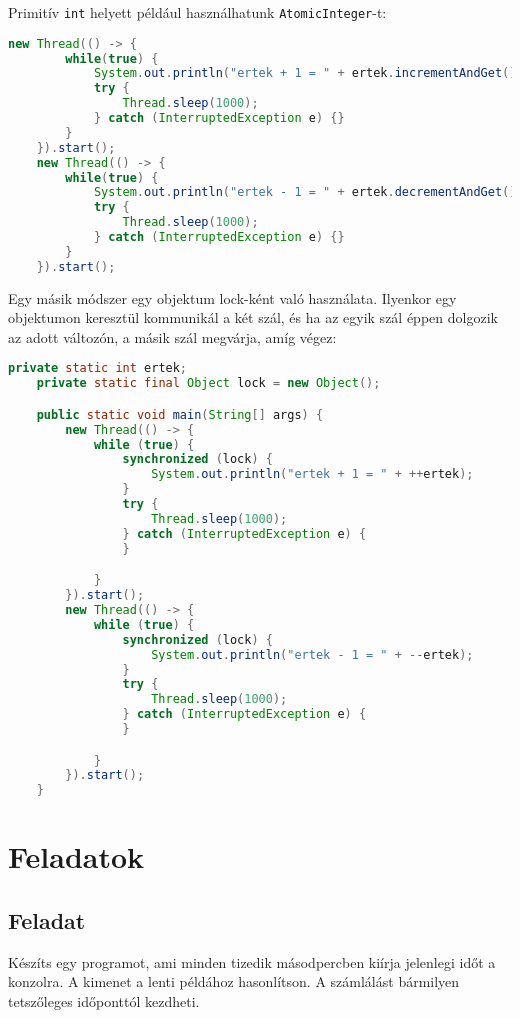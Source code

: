 \documentclass{article}
\let\l\lstinline
\begin{document}
Primitív \l{int} helyett például használhatunk \l{AtomicInteger}-t:

\begin{lstlisting}[language=Java, caption=AtomicInteger használata]
	new Thread(() -> {
		while(true) {
			System.out.println("ertek + 1 = " + ertek.incrementAndGet());
			try {
				Thread.sleep(1000);
			} catch (InterruptedException e) {}
		}
	}).start();
	new Thread(() -> {
		while(true) {
			System.out.println("ertek - 1 = " + ertek.decrementAndGet());
			try {
				Thread.sleep(1000);
			} catch (InterruptedException e) {}
		}
	}).start();
\end{lstlisting}

Egy másik módszer egy objektum lock-ként való használata. Ilyenkor egy objektumon keresztül kommunikál a két szál, és ha az egyik szál éppen dolgozik az adott változón, a másik szál megvárja, amíg végez:

\begin{lstlisting}[language=Java, caption=Lock használata]
 private static int ertek;
    private static final Object lock = new Object();

    public static void main(String[] args) {
        new Thread(() -> {
            while (true) {
                synchronized (lock) {
                    System.out.println("ertek + 1 = " + ++ertek);
                }
                try {
                    Thread.sleep(1000);
                } catch (InterruptedException e) {
                }

            }
        }).start();
        new Thread(() -> {
            while (true) {
                synchronized (lock) {
                    System.out.println("ertek - 1 = " + --ertek);
                }
                try {
                    Thread.sleep(1000);
                } catch (InterruptedException e) {
                }

            }
        }).start();
    }
\end{lstlisting}
\newpage

\section{Feladatok}

\subsection{Feladat}

Készíts egy programot, ami minden tizedik másodpercben kiírja jelenlegi időt a konzolra. A kimenet a lenti példához hasonlítson. A számlálást bármilyen tetszőleges időponttól kezdheti.
\end{document}
